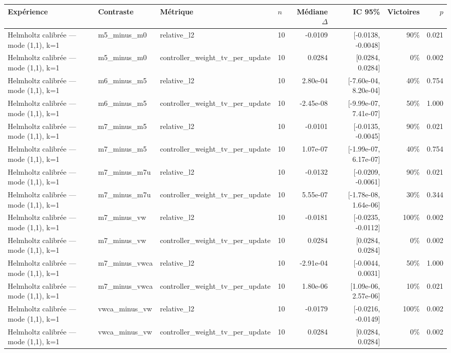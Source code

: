 \begin{tabular}{llllrrrr}
\toprule
Expérience & Contraste & Métrique & $n$ & Médiane $\Delta$ & IC 95\% & Victoires & $p$ \\
\midrule
Helmholtz calibrée — mode (1,1), k=1 & m5\_minus\_m0 & relative\_l2 & 10 & -0.0109 & [-0.0138, -0.0048] & 90\% & 0.021 \\
Helmholtz calibrée — mode (1,1), k=1 & m5\_minus\_m0 & controller\_weight\_tv\_per\_update & 10 & 0.0284 & [0.0284, 0.0284] & 0\% & 0.002 \\
Helmholtz calibrée — mode (1,1), k=1 & m6\_minus\_m5 & relative\_l2 & 10 & 2.80e-04 & [-7.60e-04, 8.20e-04] & 40\% & 0.754 \\
Helmholtz calibrée — mode (1,1), k=1 & m6\_minus\_m5 & controller\_weight\_tv\_per\_update & 10 & -2.45e-08 & [-9.99e-07, 7.41e-07] & 50\% & 1.000 \\
Helmholtz calibrée — mode (1,1), k=1 & m7\_minus\_m5 & relative\_l2 & 10 & -0.0101 & [-0.0135, -0.0045] & 90\% & 0.021 \\
Helmholtz calibrée — mode (1,1), k=1 & m7\_minus\_m5 & controller\_weight\_tv\_per\_update & 10 & 1.07e-07 & [-1.99e-07, 6.17e-07] & 40\% & 0.754 \\
Helmholtz calibrée — mode (1,1), k=1 & m7\_minus\_m7u & relative\_l2 & 10 & -0.0132 & [-0.0209, -0.0061] & 90\% & 0.021 \\
Helmholtz calibrée — mode (1,1), k=1 & m7\_minus\_m7u & controller\_weight\_tv\_per\_update & 10 & 5.55e-07 & [-1.78e-08, 1.64e-06] & 30\% & 0.344 \\
Helmholtz calibrée — mode (1,1), k=1 & m7\_minus\_vw & relative\_l2 & 10 & -0.0181 & [-0.0235, -0.0112] & 100\% & 0.002 \\
Helmholtz calibrée — mode (1,1), k=1 & m7\_minus\_vw & controller\_weight\_tv\_per\_update & 10 & 0.0284 & [0.0284, 0.0284] & 0\% & 0.002 \\
Helmholtz calibrée — mode (1,1), k=1 & m7\_minus\_vwca & relative\_l2 & 10 & -2.91e-04 & [-0.0044, 0.0031] & 50\% & 1.000 \\
Helmholtz calibrée — mode (1,1), k=1 & m7\_minus\_vwca & controller\_weight\_tv\_per\_update & 10 & 1.80e-06 & [1.09e-06, 2.57e-06] & 10\% & 0.021 \\
Helmholtz calibrée — mode (1,1), k=1 & vwca\_minus\_vw & relative\_l2 & 10 & -0.0179 & [-0.0216, -0.0149] & 100\% & 0.002 \\
Helmholtz calibrée — mode (1,1), k=1 & vwca\_minus\_vw & controller\_weight\_tv\_per\_update & 10 & 0.0284 & [0.0284, 0.0284] & 0\% & 0.002 \\
\bottomrule
\end{tabular}
